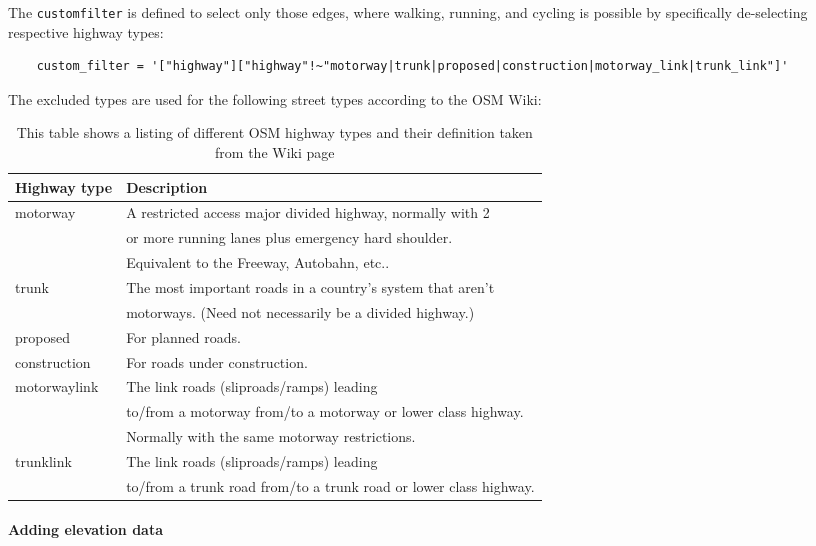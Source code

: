 The \texttt{custom\textunderscore filter} is defined to select only those edges, where walking, running, and cycling is possible by specifically de-selecting respective highway types:

\begin{lstlisting}
	custom_filter = '["highway"]["highway"!~"motorway|trunk|proposed|construction|motorway_link|trunk_link"]'
\end{lstlisting}

The excluded types are used for the following street types according to the OSM Wiki:
\begin{table}[ht]
	\centering
	\begin{tabular}{l|l}
		Highway type & Description\\
		\hline
		motorway & A restricted access major divided highway, normally with 2\\ 
		& or more running lanes plus emergency hard shoulder.\\
		& Equivalent to the Freeway, Autobahn, etc..  \\
		trunk & The most important roads in a country's system that aren't \\
		& motorways. (Need not necessarily be a divided highway.) \\
		proposed & For planned roads. \\
		construction & For roads under construction. \\
		motorway\textunderscore link & The link roads (sliproads/ramps) leading\\
		& to/from a motorway from/to a motorway or lower class highway. \\
		& Normally with the same motorway restrictions. \\
		trunk\textunderscore link & The link roads (sliproads/ramps) leading \\
		& to/from a trunk road from/to a trunk road or lower class highway. 
	\end{tabular}
	\caption[OSM highway types]{This table shows a listing of different OSM highway types and their definition taken from the Wiki page\protect\footnotemark}
	\label{tab:osmHighwayTypes}
\end{table}



\paragraph{Adding elevation data}

